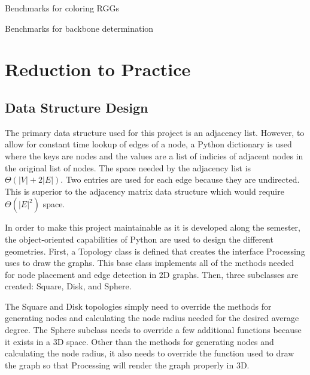 \documentclass{article}
\begin{document}
    \begin{center}
        \begin{table}[h]
            \centering
            \caption{Benchmarks for coloring RGGs}
            \label{tab2}
        \end{table}
    \end{center}

    \begin{center}
        \begin{table}[h]
            \centering
            \begin{adjustbox}{width=1\textwidth}
            \end{adjustbox}
            \caption{Benchmarks for backbone determination}
            \label{tab3}
        \end{table}
    \end{center}

\section{Reduction to Practice}

    \subsection{Data Structure Design}
    The primary data structure used for this project is an adjacency list. However, to allow for constant time lookup of edges of a node, a Python dictionary is used where the keys are nodes and the values are a list of indicies of adjacent nodes in the original list of nodes. The space needed by the adjacency list is $\Theta(|V| + 2|E|)$. Two entries are used for each edge because they are undirected. This is superior to the adjacency matrix data structure which would require $\Theta(|E|^2)$ space.
    \par
    In order to make this project maintainable as it is developed along the semester, the object-oriented capabilities of Python are used to design the different geometries. First, a Topology class is defined that creates the interface Processing uses to draw the graphs. This base class implements all of the methods needed for node placement and edge detection in 2D graphs. Then, three subclasses are created: Square, Disk, and Sphere.
    \par
    The Square and Disk topologies simply need to override the methods for generating nodes and calculating the node radius needed for the desired average degree. The Sphere subclass needs to override a few additional functions because it exists in a 3D space. Other than the methods for generating nodes and calculating the node radius, it also needs to override the function used to draw the graph so that Processing will render the graph properly in 3D.
\end{document}

